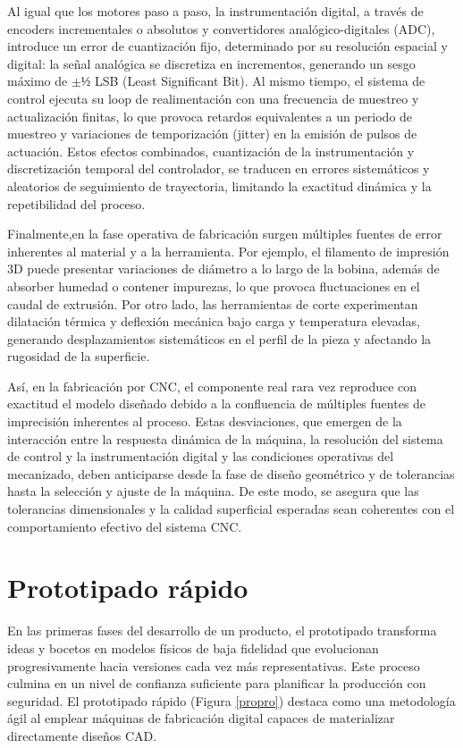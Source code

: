 Al igual que los motores paso a paso, la instrumentación digital, a través de encoders incrementales o absolutos y convertidores analógico-digitales (ADC), introduce un error de cuantización fijo, determinado por su resolución espacial y digital: la señal analógica se discretiza en incrementos, generando un sesgo máximo de $\pm ½$ LSB (Least Significant Bit). Al mismo tiempo, el sistema de control ejecuta su loop de realimentación con una frecuencia de muestreo y actualización finitas, lo que provoca retardos equivalentes a un periodo de muestreo y variaciones de temporización (jitter) en la emisión de pulsos de actuación. Estos efectos combinados, cuantización de la instrumentación y discretización temporal del controlador, se traducen en errores sistemáticos y aleatorios de seguimiento de trayectoria, limitando la exactitud dinámica y la repetibilidad del proceso.

Finalmente,en la fase operativa de fabricación surgen múltiples fuentes de error inherentes al material y a la herramienta. Por ejemplo, el filamento de impresión 3D puede presentar variaciones de diámetro a lo largo de la bobina, además de absorber humedad o contener impurezas, lo que provoca fluctuaciones en el caudal de extrusión. Por otro lado, las herramientas de corte experimentan dilatación térmica y deflexión mecánica bajo carga y temperatura elevadas, generando desplazamientos sistemáticos en el perfil de la pieza y afectando la rugosidad de la superficie.

Así, en la fabricación por CNC, el componente real rara vez reproduce con exactitud el modelo diseñado debido a la confluencia de múltiples fuentes de imprecisión inherentes al proceso. Estas desviaciones, que emergen de la interacción entre la respuesta dinámica de la máquina, la resolución del sistema de control y la instrumentación digital y las condiciones operativas del mecanizado, deben anticiparse desde la fase de diseño geométrico y de tolerancias hasta la selección y ajuste de la máquina. De este modo, se asegura que las tolerancias dimensionales y la calidad superficial esperadas sean coherentes con el comportamiento efectivo del sistema CNC.

\section{Prototipado rápido}

En las primeras fases del desarrollo de un producto, el prototipado transforma ideas y bocetos en modelos físicos de baja fidelidad que evolucionan progresivamente hacia versiones cada vez más representativas. Este proceso culmina en un nivel de confianza suficiente para planificar la producción con seguridad. El prototipado rápido (Figura \ref{propro}) destaca como una metodología ágil al emplear máquinas de fabricación digital capaces de materializar directamente diseños CAD.

